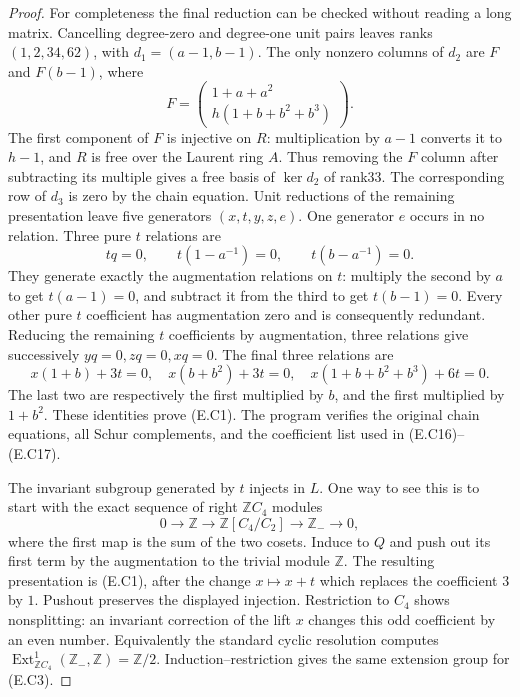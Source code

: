 \begin{proof}
For completeness the final reduction can be checked
without reading a long matrix. Cancelling degree-zero
and degree-one unit pairs leaves ranks $(1,2,34,62)$,
with $d_1=(a-1,b-1)$. The only nonzero columns of
$d_2$ are $F$ and $F(b-1)$, where
\[
 F=\begin{pmatrix}1+a+a^2\\h(1+b+b^2+b^3)\end{pmatrix}.
 \tag{E.C15}
\]
The first component of $F$ is injective on $R$:
multiplication by $a-1$ converts it to $h-1$, and
$R$ is free over the Laurent ring $A$. Thus removing
the $F$ column after subtracting its multiple gives
a free basis of $\ker d_2$ of rank33. The corresponding
row of $d_3$ is zero by the chain equation. Unit
reductions of the remaining presentation leave five
generators $(x,t,y,z,e)$. One generator $e$ occurs
in no relation. Three pure $t$ relations are
\[
 tq=0,\qquad t(1-a^{-1})=0,
                  \qquad t(b-a^{-1})=0.
 \tag{E.C16}
\]
They generate exactly the augmentation relations on
$t$: multiply the second by $a$ to get $t(a-1)=0$,
and subtract it from the third to get $t(b-1)=0$.
Every other pure $t$ coefficient has augmentation
zero and is consequently redundant. Reducing the
remaining $t$ coefficients by augmentation, three
relations give successively $yq=0,zq=0,xq=0$.
The final three relations are
\[
 x(1+b)+3t=0,\quad x(b+b^2)+3t=0,
                   \quad x(1+b+b^2+b^3)+6t=0.
 \tag{E.C17}
\]
The last two are respectively the first multiplied
by $b$, and the first multiplied by $1+b^2$.
These identities prove (E.C1). The program verifies
the original chain equations, all Schur complements,
and the coefficient list used in (E.C16)--(E.C17).

The invariant subgroup generated by $t$ injects in
$L$. One way to see this is to start with the exact
sequence of right $\mathbb ZC_4$ modules
\[
 0\longrightarrow\mathbb Z\longrightarrow
 \mathbb Z[C_4/C_2]\longrightarrow\mathbb Z_-\longrightarrow0,
\]
where the first map is the sum of the two cosets.
Induce to $Q$ and push out its first term by the
augmentation to the trivial module $\mathbb Z$.
The resulting presentation is (E.C1), after the
change $x\mapsto x+t$ which replaces the coefficient
$3$ by $1$. Pushout preserves the displayed injection.
Restriction to $C_4$ shows nonsplitting: an invariant
correction of the lift $x$ changes this odd coefficient
by an even number. Equivalently the standard cyclic
resolution computes
$\operatorname{Ext}^1_{\mathbb ZC_4}(\mathbb Z_-,\mathbb Z)
=\mathbb Z/2$. Induction--restriction gives the same
extension group for (E.C3).


\end{proof}
